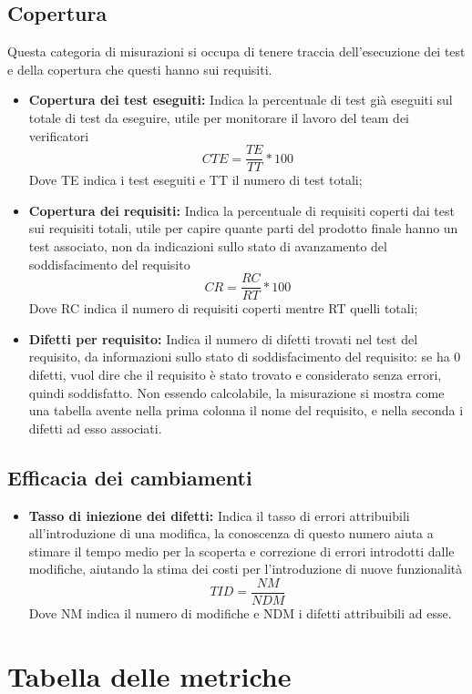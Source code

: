 \documentclass[PianoDiProgetto.tex]{subfiles}
\begin{document}
\subsection{Copertura}
Questa categoria di misurazioni si occupa di tenere traccia dell'esecuzione dei test e della copertura che questi hanno sui requisiti.
\begin{itemize}
	\item \textbf{Copertura dei test eseguiti:} Indica la percentuale di test già eseguiti sul totale di test da eseguire, utile per monitorare il lavoro del team dei verificatori
	\[CTE=\dfrac{TE}{TT}*100\]
	Dove TE indica i test eseguiti e TT il numero di test totali;
	\item \textbf{Copertura dei requisiti:} Indica la percentuale di requisiti coperti dai test sui requisiti totali, utile per capire quante parti del prodotto finale hanno un test associato, non da indicazioni sullo stato di avanzamento del soddisfacimento del requisito
	\[CR=\dfrac{RC}{RT}*100\]
	Dove RC indica il numero di requisiti coperti mentre RT quelli totali;
	\item \textbf{Difetti per requisito:} Indica il numero di difetti trovati nel test del requisito, da informazioni sullo stato di soddisfacimento del requisito: se ha 0 difetti, vuol dire che il requisito è stato trovato e considerato senza errori, quindi soddisfatto.
	Non essendo calcolabile, la misurazione si mostra come una tabella avente nella prima colonna il nome del requisito, e nella seconda i difetti ad esso associati.
\end{itemize}
\subsection{Efficacia dei cambiamenti}
\begin{itemize}
	\item \textbf{Tasso di iniezione dei difetti:} Indica il tasso di errori attribuibili all'introduzione di una modifica, la conoscenza di questo numero aiuta a stimare il tempo medio per la scoperta e correzione di errori introdotti dalle modifiche, aiutando la stima dei costi per l'introduzione di nuove funzionalità
	\[TID=\dfrac{NM}{NDM}\]
	Dove NM indica il numero di modifiche e NDM i difetti attribuibili ad esse.
\end{itemize}
\section{Tabella delle metriche}
\end{document}
